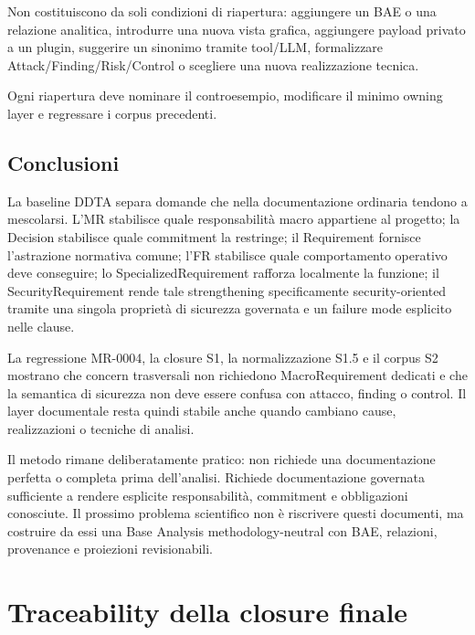 \documentclass[12pt,a4paper,oneside]{report}
\begin{document}
Non costituiscono da soli condizioni di riapertura: aggiungere un BAE o una relazione analitica, introdurre una nuova vista grafica, aggiungere payload privato a un plugin, suggerire un sinonimo tramite tool/LLM, formalizzare Attack/Finding/Risk/Control o scegliere una nuova realizzazione tecnica.

Ogni riapertura deve nominare il controesempio, modificare il minimo owning layer e regressare i corpus precedenti.

\section{Conclusioni}

La baseline DDTA separa domande che nella documentazione ordinaria tendono a mescolarsi. L'MR stabilisce quale responsabilità macro appartiene al progetto; la Decision stabilisce quale commitment la restringe; il Requirement fornisce l'astrazione normativa comune; l'FR stabilisce quale comportamento operativo deve conseguire; lo SpecializedRequirement rafforza localmente la funzione; il SecurityRequirement rende tale strengthening specificamente security-oriented tramite una singola proprietà di sicurezza governata e un failure mode esplicito nelle clause.

La regressione MR-0004, la closure S1, la normalizzazione S1.5 e il corpus S2 mostrano che concern trasversali non richiedono MacroRequirement dedicati e che la semantica di sicurezza non deve essere confusa con attacco, finding o control. Il layer documentale resta quindi stabile anche quando cambiano cause, realizzazioni o tecniche di analisi.

Il metodo rimane deliberatamente pratico: non richiede una documentazione perfetta o completa prima dell'analisi. Richiede documentazione governata sufficiente a rendere esplicite responsabilità, commitment e obbligazioni conosciute. Il prossimo problema scientifico non è riscrivere questi documenti, ma costruire da essi una Base Analysis methodology-neutral con BAE, relazioni, provenance e proiezioni revisionabili.

\appendix
\chapter*{Traceability della closure finale}
\end{document}

